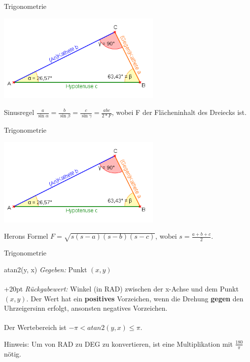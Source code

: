 \begin{frame}{Trigonometrie}
	\begin{center}
		\includegraphics[width=0.6\textwidth,height=.8\textheight,keepaspectratio]{dreieck.png}
	\end{center}
	
	\begin{block}{Sinusregel}
		$\frac{a}{\sin \alpha} = \frac{b}{\sin \beta} = \frac{c}{\sin \gamma} = \frac{abc}{2 * F}$,
		wobei F der Flächeninhalt des Dreiecks ist.
	\end{block}
\end{frame}

\begin{frame}{Trigonometrie}
	\begin{center}
		\includegraphics[width=0.6\textwidth,height=.8\textheight,keepaspectratio]{dreieck.png}
	\end{center}
	
	\begin{block}{Herons Formel}
		$F = \sqrt{s(s - a)(s - b)(s - c)}$, wobei $s = \frac{a + b + c}{2}$.
	\end{block}
\end{frame}

\begin{frame}{Trigonometrie}
	\begin{block}{atan2(y, x)}
		\textit{Gegeben:} Punkt $(x,y)$\\ \ \\
		
		\hangindent+20pt 
		\textit{Rückgabewert:} Winkel (in RAD) zwischen der x-Achse und dem Punkt $(x,y)$. Der Wert hat ein \textbf{positives} Vorzeichen, wenn die Drehung \textbf{gegen} den Uhrzeigersinn erfolgt, ansonsten negatives Vorzeichen.\\ \ \\

		Der Wertebereich ist $-\pi < atan2(y, x) \leq \pi$.
	\end{block}
	
	Hinweis: Um von RAD zu DEG zu konvertieren, ist eine Multiplikation mit $\frac{180}{\pi}$ nötig.
\end{frame}

